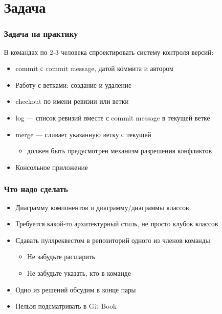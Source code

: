 \documentclass{../cscslides}
\begin{document}
    
    \frame{\titlepage}

    \section{Задача}

    \begin{frame}
        \frametitle{Задача на практику}
        В командах по 2-3 человека спроектировать систему контроля версий:
        \begin{itemize}
            \item commit с commit message, датой коммита и автором
            \item Работу с ветками: создание и удаление
            \item checkout по имени ревизии или ветки
            \item log --- список ревизий вместе с commit message в текущей ветке
            \item merge --- сливает указанную ветку с текущей
            \begin{itemize}
                \item должен быть предусмотрен механизм разрешения конфликтов
            \end{itemize}
            \item Консольное приложение
        \end{itemize}
    \end{frame}

    \begin{frame}
        \frametitle{Что надо сделать}
        \begin{itemize}
            \item Диаграмму компонентов и диаграмму/диаграммы классов
            \item Требуется какой-то архитектурный стиль, не просто клубок классов
            \item Сдавать пуллреквестом в репозиторий одного из членов команды
            \begin{itemize}
                \item Не забудьте расшарить
                \item Не забудьте указать, кто в команде
            \end{itemize}
            \item Одно из решений обсудим в конце пары
            \item Нельзя подсматривать в Git Book
        \end{itemize}
    \end{frame}
\end{document}
